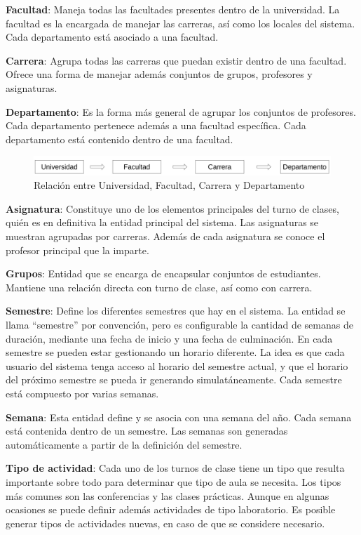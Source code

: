 \textbf{Facultad}: Maneja todas las facultades presentes dentro de la universidad. La facultad es la encargada de manejar las carreras, así como los locales del sistema. Cada departamento está asociado a una facultad.

\textbf{Carrera}: Agrupa todas las carreras que puedan existir dentro de una facultad. Ofrece una forma de manejar además conjuntos de grupos, profesores y asignaturas.

\textbf{Departamento}: Es la forma más general de agrupar los conjuntos de profesores. Cada departamento pertenece además a una facultad específica. Cada departamento está contenido dentro de una facultad.

\begin{figure}[h!]
	\centering
	\includegraphics[width=1\linewidth]{images/Chapter 2/department_relation}
	\caption{Relación entre Universidad, Facultad, Carrera y Departamento}
	\label{fig:department_relation}
\end{figure}

\textbf{Asignatura}: Constituye uno de los elementos principales del turno de clases, quién es en definitiva la entidad principal del sistema. Las asignaturas se muestran agrupadas por carreras. Además de cada asignatura se conoce el profesor principal que la imparte.

\textbf{Grupos}: Entidad que se encarga de encapsular conjuntos de estudiantes. Mantiene una relación directa con turno de clase, así como con carrera. 

\textbf{Semestre}: Define los diferentes semestres que hay en el sistema. La entidad se llama “semestre” por convención, pero es configurable la cantidad de semanas de duración, mediante una fecha de inicio y una fecha de culminación. En cada semestre se pueden estar gestionando un horario diferente. La idea es que cada usuario del sistema tenga acceso al horario del semestre actual, y que el horario del próximo semestre se pueda ir generando simulatáneamente. Cada semestre está compuesto por varias semanas.

\textbf{Semana}: Esta entidad define y se asocia con una semana del año. Cada semana está contenida dentro de un semestre. Las semanas son generadas automáticamente a partir de la definición del semestre.

\textbf{Tipo de actividad}: Cada uno de los turnos de clase tiene un tipo que resulta importante sobre todo
 para determinar que tipo de aula se necesita. Los tipos más comunes son las conferencias y las clases
 prácticas. Aunque en algunas ocasiones se puede definir además actividades de tipo laboratorio. Es posible generar tipos de actividades nuevas, en caso de que se considere necesario.

